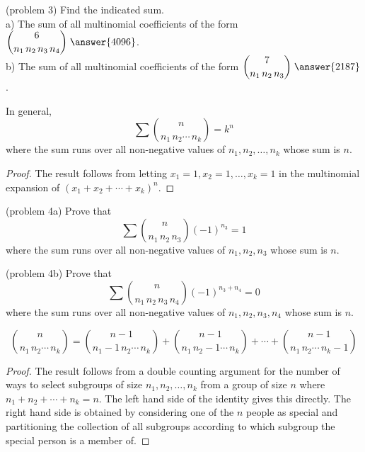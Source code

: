 \documentclass[handout]{ximera}
\begin{document}
\begin{problem}(problem 3)
Find the indicated sum.\\
a) The sum of all multinomial coefficients of the form $\dis \binom{6}{n_1\, n_2\, n_3\, n_4}\; \answer{4096}$.\\[8pt]
b) The sum of all multinomial coefficients of the form $\dis \binom{7}{n_1\, n_2\, n_3} \; \answer{2187}$.\\

\end{problem}
 
\begin{proposition}
In general,
\[
\sum \binom{n}{n_1 \, n_2 \cdots \, n_k} = k^n
\]
where the sum runs over all non-negative values of $n_1, n_2, \dots, n_k$ whose sum is $n$.
\end{proposition}

\begin{proof}
The result follows from letting $x_1 = 1, x_2 = 1, \dots, x_k = 1$ in the multinomial expansion of 
$(x_1 + x_2 + \cdots + x_k)^n$.
\end{proof}

\begin{problem}(problem 4a)
Prove that
\[
\sum \binom{n}{n_1 \, n_2 \, n_3} (-1)^{n_3} = 1
\]
where the sum runs over all non-negative values of $n_1, n_2, n_3$ whose sum is $n$.
\end{problem}

\begin{problem}(problem 4b)
Prove that
\[
\sum \binom{n}{n_1 \, n_2 \, n_3 \, n_4} (-1)^{n_3 + n_4} = 0
\]
where the sum runs over all non-negative values of $n_1, n_2, n_3, n_4$ whose sum is $n$.
\end{problem}



\begin{proposition}
\[
\binom{n}{n_1 \, n_2 \cdots \, n_k} = \binom{n-1}{n_1 -1 \, n_2 \cdots \, n_k} + \binom{n-1}{n_1 \, n_2 -1 \cdots \, n_k} + \cdots+ \binom{n-1}{n_1 \, n_2 \cdots \, n_k -1 }
\]
\end{proposition}

\begin{proof}
The result follows from a double counting argument for the number of ways to select 
subgroups of size $n_1, n_2, \dots, n_k$ from a group of size $n$ where $n_1 + n_2 + \cdots + n_k = n$. 
The left hand side of the identity gives this directly.  The right hand side is obtained by 
considering one of the $n$ people as special and partitioning the collection of all subgroups 
according to which subgroup the special person is a member of.
\end{proof}



\end{document}
